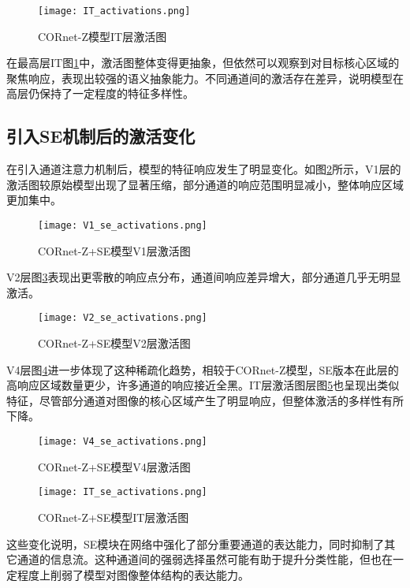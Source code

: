 \begin{figure}[hbt]
	\centering
	\texttt{[image: IT\_activations.png]}
	\caption{CORnet-Z模型IT层激活图}
	\label{f.it_act}
\end{figure}

在最高层IT图\ref{f.it_act}中，激活图整体变得更抽象，但依然可以观察到对目标核心区域的聚焦响应，表现出较强的语义抽象能力。不同通道间的激活存在差异，说明模型在高层仍保持了一定程度的特征多样性。

\subsection{引入SE机制后的激活变化}

在引入通道注意力机制后，模型的特征响应发生了明显变化。如图\ref{f.v1_se_act}所示，V1层的激活图较原始模型出现了显著压缩，部分通道的响应范围明显减小，整体响应区域更加集中。

\begin{figure}[hbt]
	\centering
	\texttt{[image: V1\_se\_activations.png]}
	\caption{CORnet-Z+SE模型V1层激活图}
	\label{f.v1_se_act}
\end{figure}

V2层图\ref{f.v2_se_act}表现出更零散的响应点分布，通道间响应差异增大，部分通道几乎无明显激活。

\begin{figure}[hbt]
	\centering
	\texttt{[image: V2\_se\_activations.png]}
	\caption{CORnet-Z+SE模型V2层激活图}
	\label{f.v2_se_act}
\end{figure}

V4层图\ref{f.v4_se_act}进一步体现了这种稀疏化趋势，相较于CORnet-Z模型，SE版本在此层的高响应区域数量更少，许多通道的响应接近全黑。IT层激活图层图\ref{f.it_se_act}也呈现出类似特征，尽管部分通道对图像的核心区域产生了明显响应，但整体激活的多样性有所下降。

\begin{figure}[hbt]
	\centering
	\texttt{[image: V4\_se\_activations.png]}
	\caption{CORnet-Z+SE模型V4层激活图}
	\label{f.v4_se_act}
\end{figure}

\begin{figure}[hbt]
	\centering
	\texttt{[image: IT\_se\_activations.png]}
	\caption{CORnet-Z+SE模型IT层激活图}
	\label{f.it_se_act}
\end{figure}

这些变化说明，SE模块在网络中强化了部分重要通道的表达能力，同时抑制了其它通道的信息流。这种通道间的强弱选择虽然可能有助于提升分类性能，但也在一定程度上削弱了模型对图像整体结构的表达能力。

